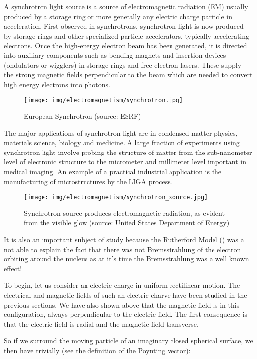 	A synchrotron light source is a source of electromagnetic radiation (EM) usually produced by a storage ring or more generally any electric charge particle in acceleration. First observed in synchrotrons, synchrotron light is now produced by storage rings and other specialized particle accelerators, typically accelerating electrons. Once the high-energy electron beam has been generated, it is directed into auxiliary components such as bending magnets and insertion devices (ondulators or wigglers) in storage rings and free electron lasers. These supply the strong magnetic fields perpendicular to the beam which are needed to convert high energy electrons into photons.
	\begin{figure}[H]
		\centering
		\texttt{[image: img/electromagnetism/synchrotron.jpg]}
		\caption{European Synchrotron (source: ESRF)}
	\end{figure}
	The major applications of synchrotron light are in condensed matter physics, materials science, biology and medicine. A large fraction of experiments using synchrotron light involve probing the structure of matter from the sub-nanometer level of electronic structure to the micrometer and millimeter level important in medical imaging. An example of a practical industrial application is the manufacturing of microstructures by the LIGA process.
	\begin{figure}[H]
		\centering
		\texttt{[image: img/electromagnetism/synchrotron\_source.jpg]}
		\caption{Synchrotron source produces electromagnetic radiation, as evident from the visible glow (source: United States Department of Energy)}
	\end{figure}
	It is also an important subject of study because the Rutherford  Model () was a not able to explain the fact that there was not Bremsstrahlung of the electron orbiting around the nucleus as at it's time the Bremsstrahlung was a well known effect!
	
	To begin, let us consider an electric charge in uniform rectilinear motion. The electrical and magnetic fields of such an electric charve have been studied in the previous sections. We have also shown above that the magnetic field is in this configuration, always perpendicular to the electric field. The first consequence is that the electric field is radial and the magnetic field transverse.

	So if we surround the moving particle of an imaginary closed spherical surface, we then have trivially (see the definition of the Poynting vector):
	
